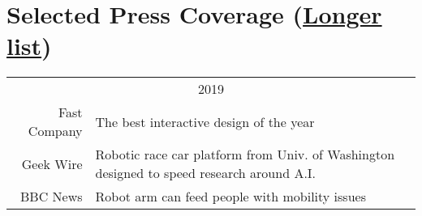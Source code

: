 
\section{Selected Press Coverage (\href{https://personalrobotics.cs.washington.edu/press/}{Longer list})}
\begin{tabularx}{\linewidth}{rX}
\multicolumn{2}{c}{2019}\\ 
Fast Company & The best interactive design of the year\\
Geek Wire & Robotic race car platform from Univ. of Washington designed to speed research around A.I.\\
BBC News & Robot arm can feed people with mobility issues\\
\end{tabularx}


